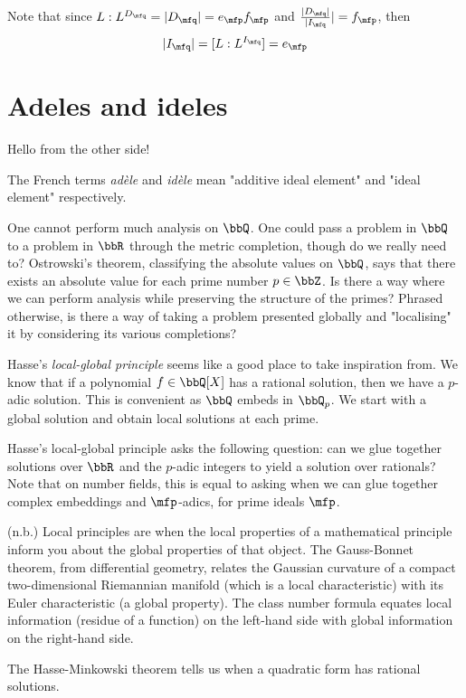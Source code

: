 \documentclass[a4paper, 12pt,oneside,openany]{book}
\begin{document}
Note that since $L:L^{D_\mfq} = |D_\mfq| = e_\mfp f_\mfp$ and $\frac{|D_\mfq|}{|I_\mfq}|=f_{\mfp}$, then $$|I_\mfq|=[L:L^{I_\mfq}]=e_\mfp$$

\section{Adeles and ideles}

Hello from the other side!

The French terms \emph{adèle} and \emph{idèle} mean "additive ideal element" and "ideal element" respectively. 

One cannot perform much analysis on $\bbQ$. One could pass a problem in $\bbQ$ to a problem in $\bbR$ through the metric completion, though do we really need to? Ostrowski's theorem, classifying the absolute values on $\bbQ$, says that there exists an absolute value for each prime number $p\in\bbZ$. Is there a way where we can perform analysis while preserving the structure of the primes? Phrased otherwise, is there a way of taking a problem presented globally and "localising" it by considering its various completions?

Hasse's \emph{local-global principle} seems like a good place to take inspiration from. We know that if a polynomial $f \in \bbQ[X]$ has a rational solution, then we have a $p$-adic solution. This is convenient as $\bbQ$ embeds in $\bbQ_p$. We start with a global solution and obtain local solutions at each prime. 

Hasse's local-global principle asks the following question: can we glue together solutions over $\bbR$ and the $p$-adic integers to yield a solution over rationals? Note that on number fields, this is equal to asking when we can glue together complex embeddings and $\mfp$-adics, for prime ideals $\mfp$.

(n.b.) Local principles are when the local properties of a mathematical principle inform you about the global properties of that object. The Gauss-Bonnet theorem, from differential geometry, relates the Gaussian curvature of a compact two-dimensional Riemannian manifold (which is a local characteristic) with its Euler characteristic (a global property). The class number formula equates local information (residue of a function) on the left-hand side with global information on the right-hand side.

The Hasse-Minkowski theorem tells us when a quadratic form has rational solutions. 

\end{document}
